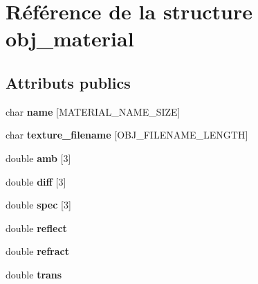 \hypertarget{structobj__material}{\section{Référence de la structure obj\-\_\-material}
\label{structobj__material}
}
\subsection*{Attributs publics}
\begin{DoxyCompactItemize}
\item 
\hypertarget{structobj__material_a22c868555082c2637cef0515b5a7ca6b}{char {\bfseries name} \mbox{[}M\-A\-T\-E\-R\-I\-A\-L\-\_\-\-N\-A\-M\-E\-\_\-\-S\-I\-Z\-E\mbox{]}}\label{structobj__material_a22c868555082c2637cef0515b5a7ca6b}

\item 
\hypertarget{structobj__material_a432c6437ac6a50152c553684fab0aaef}{char {\bfseries texture\-\_\-filename} \mbox{[}O\-B\-J\-\_\-\-F\-I\-L\-E\-N\-A\-M\-E\-\_\-\-L\-E\-N\-G\-T\-H\mbox{]}}\label{structobj__material_a432c6437ac6a50152c553684fab0aaef}

\item 
\hypertarget{structobj__material_a0127f4464e685658f8bf9db697688f8d}{double {\bfseries amb} \mbox{[}3\mbox{]}}\label{structobj__material_a0127f4464e685658f8bf9db697688f8d}

\item 
\hypertarget{structobj__material_a6f9b724555e48815e800b4f82c291f19}{double {\bfseries diff} \mbox{[}3\mbox{]}}\label{structobj__material_a6f9b724555e48815e800b4f82c291f19}

\item 
\hypertarget{structobj__material_aaba883a6684bc146f396a39534e5ae57}{double {\bfseries spec} \mbox{[}3\mbox{]}}\label{structobj__material_aaba883a6684bc146f396a39534e5ae57}

\item 
\hypertarget{structobj__material_a4763ba95918c9bf5256b79e3603adc58}{double {\bfseries reflect}}\label{structobj__material_a4763ba95918c9bf5256b79e3603adc58}

\item 
\hypertarget{structobj__material_a322daa5a65bd76d646dea59bf93e29c0}{double {\bfseries refract}}\label{structobj__material_a322daa5a65bd76d646dea59bf93e29c0}

\item 
\hypertarget{structobj__material_adfe718fbbdb972e83b4159d4c634b14b}{double {\bfseries trans}}\label{structobj__material_adfe718fbbdb972e83b4159d4c634b14b}


\end{DoxyCompactItemize}
